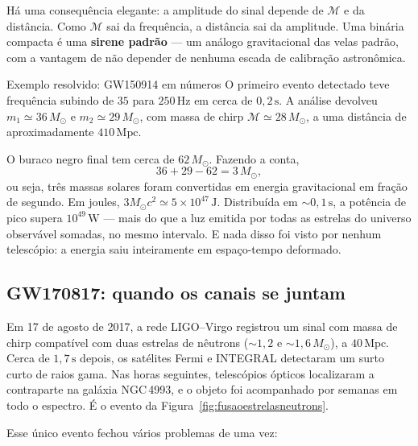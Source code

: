 \documentclass[11pt,a4paper]{article}
\begin{document}
Há uma consequência elegante: a amplitude do sinal depende de $\mathcal{M}$ e da distância. Como $\mathcal{M}$ sai da frequência, a distância sai da amplitude. Uma binária compacta é uma \textbf{sirene padrão} --- um análogo gravitacional das velas padrão, com a vantagem de não depender de nenhuma escada de calibração astronômica.

\begin{lessonblock}{Exemplo resolvido: GW150914 em números}
O primeiro evento detectado teve frequência subindo de $35$ para $250\,\mathrm{Hz}$ em cerca de $0{,}2\,\mathrm{s}$. A análise devolveu $m_1\simeq36\,M_\odot$ e $m_2\simeq29\,M_\odot$, com massa de chirp $\mathcal{M}\simeq28\,M_\odot$, a uma distância de aproximadamente $410\,\mathrm{Mpc}$.

O buraco negro final tem cerca de $62\,M_\odot$. Fazendo a conta,
\[
36+29-62=3\,M_\odot,
\]
ou seja, três massas solares foram convertidas em energia gravitacional em fração de segundo. Em joules, $3M_\odot c^2\simeq5\times10^{47}\,\mathrm{J}$. Distribuída em $\sim0{,}1\,\mathrm{s}$, a potência de pico supera $10^{49}\,\mathrm{W}$ --- mais do que a luz emitida por todas as estrelas do universo observável somadas, no mesmo intervalo. E nada disso foi visto por nenhum telescópio: a energia saiu inteiramente em espaço-tempo deformado.
\end{lessonblock}

\subsection*{GW170817: quando os canais se juntam}

Em 17 de agosto de 2017, a rede LIGO--Virgo registrou um sinal com massa de chirp compatível com duas estrelas de nêutrons ($\sim1{,}2$ e $\sim1{,}6\,M_\odot$), a $40\,\mathrm{Mpc}$. Cerca de $1{,}7\,\mathrm{s}$ depois, os satélites Fermi e INTEGRAL detectaram um surto curto de raios gama. Nas horas seguintes, telescópios ópticos localizaram a contraparte na galáxia NGC\,4993, e o objeto foi acompanhado por semanas em todo o espectro. É o evento da Figura~\ref{fig:fusaoestrelasneutrons}.

Esse único evento fechou vários problemas de uma vez:
\end{document}
